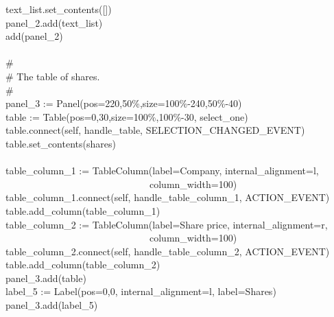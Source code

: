 {\>   \ \ \ text\_list.set\_contents([]) \\
\>   \ \ \ panel\_2.add(text\_list) \\
\>   \ \ \ add(panel\_2) \\
\ \\
\>   \ \ \ \# \\
\>   \ \ \ \# The table of shares. \\
\>   \ \ \ \# \\
\>   \ \ \ panel\_3 :=
Panel({\textquotedbl}pos=220,50\%{\textquotedbl},{\textquotedbl}size=100\%-240,50\%-40{\textquotedbl}) \\
\>   \ \ \ table :=
Table({\textquotedbl}pos=0,30{\textquotedbl},{\textquotedbl}size=100\%,100\%-30{\textquotedbl},
{\textquotedbl}select\_one{\textquotedbl}) \\
\>   \ \ \ table.connect(self,
{\textquotedbl}handle\_table{\textquotedbl},
SELECTION\_CHANGED\_EVENT) \\
\>   \ \ \ table.set\_contents(shares) \\
\ \\
\>   \ \ \ table\_column\_1 :=
TableColumn({\textquotedbl}label=Company{\textquotedbl},
{\textquotedbl}internal\_alignment=l{\textquotedbl}, \\
\>   \ \ \ \ \ \ \ \ \ \ \ \ \ \ \ \ \ \ \ \ \ \ \ \ \ \ \ \ \ \ \ \ \ {\textquotedbl}column\_width=100{\textquotedbl}) \\
\>   \ \ \ table\_column\_1.connect(self,
{\textquotedbl}handle\_table\_column\_1{\textquotedbl}, ACTION\_EVENT) \\
\>   \ \ \ table.add\_column(table\_column\_1) \\
\>   \ \ \ table\_column\_2 := TableColumn({\textquotedbl}label=Share
price{\textquotedbl},
{\textquotedbl}internal\_alignment=r{\textquotedbl}, \\
\>   \ \ \ \ \ \ \ \ \ \ \ \ \ \ \ \ \ \ \ \ \ \ \ \ \ \ \ \ \ \ \ \ \ {\textquotedbl}column\_width=100{\textquotedbl}) \\
\>   \ \ \ table\_column\_2.connect(self,
{\textquotedbl}handle\_table\_column\_2{\textquotedbl}, ACTION\_EVENT) \\
\>   \ \ \ table.add\_column(table\_column\_2) \\
\>   \ \ \ panel\_3.add(table) \\
\>   \ \ \ label\_5 := Label({\textquotedbl}pos=0,0{\textquotedbl},
{\textquotedbl}internal\_alignment=l{\textquotedbl},
{\textquotedbl}label=Shares{\textquotedbl}) \\
\>   \ \ \ panel\_3.add(label\_5) \\
}
